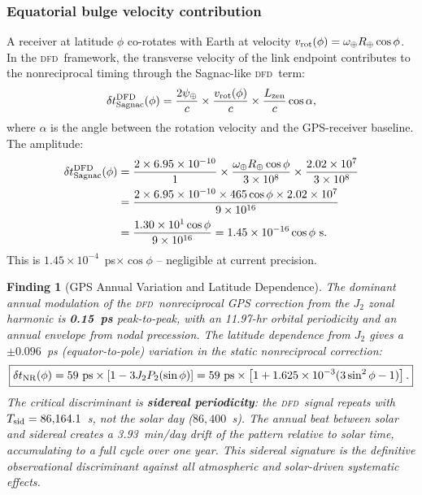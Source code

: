 \documentclass[aps,prd,twocolumn,superscriptaddress,nofootinbib,longbibliography]{revtex4-2}
\newcommand{\DFD}{\textsc{dfd}}
\newtheorem{finding}{Finding}
\begin{document}
\subsubsection{Equatorial bulge velocity contribution}

A receiver at latitude $\phi$ co-rotates with Earth at velocity
$v_{\rm rot}(\phi) = \omega_\oplus R_\oplus\cos\phi$.  In the \DFD\ framework,
the transverse velocity of the link endpoint contributes to the nonreciprocal
timing through the Sagnac-like \DFD\ term:
\begin{equation}
\delta t_{\rm Sagnac}^{\rm DFD}(\phi)
= \frac{2\psi_\oplus}{c}\times\frac{v_{\rm rot}(\phi)}{c}\times\frac{L_{\rm zen}}{c}
\cos\alpha,
\end{equation}
where $\alpha$ is the angle between the rotation velocity and the GPS-receiver
baseline.  The amplitude:
\begin{align}
\delta t_{\rm Sagnac}^{\rm DFD}(\phi)
&= \frac{2\times6.95\times10^{-10}}{1}
\times\frac{\omega_\oplus R_\oplus\cos\phi}{3\times10^8}
\times\frac{2.02\times10^7}{3\times10^8}
\nonumber\\
&= \frac{2\times6.95\times10^{-10}\times465\cos\phi\times2.02\times10^7}{9\times10^{16}}
\nonumber\\
&= \frac{1.30\times10^{1}\cos\phi}{9\times10^{16}}
= 1.45\times10^{-16}\cos\phi\ \si{s}.
\end{align}
This is $1.45\times10^{-4}$~ps$\times\cos\phi$ -- negligible at current precision.

\begin{finding}[GPS Annual Variation and Latitude Dependence]
\label{finding:gps-annual}
The dominant annual modulation of the \DFD\ nonreciprocal GPS correction
from the $J_2$ zonal harmonic is \textbf{0.15~ps} peak-to-peak, with
an 11.97-hr orbital periodicity and an annual envelope from nodal
precession.  The latitude dependence from $J_2$ gives a $\pm0.096$~ps
(equator-to-pole) variation in the static nonreciprocal correction:
\begin{equation}
\boxed{
\delta t_{\rm NR}(\phi) = 59\ \si{ps}\times
\left[1 - 3J_2 P_2(\sin\phi)\right]
= 59\ \si{ps}\times\left[1 + 1.625\times10^{-3}(3\sin^2\phi - 1)\right].
}
\end{equation}
The critical discriminant is \textbf{sidereal periodicity}: the \DFD\
signal repeats with $T_{\rm sid} = 86{,}164.1$~s, not the solar day
($86{,}400$~s).  The annual beat between solar and sidereal creates
a 3.93~min/day drift of the pattern relative to solar time, accumulating
to a full cycle over one year.  This sidereal signature is the definitive
observational discriminant against all atmospheric and solar-driven
systematic effects.
\end{finding}
\end{document}
